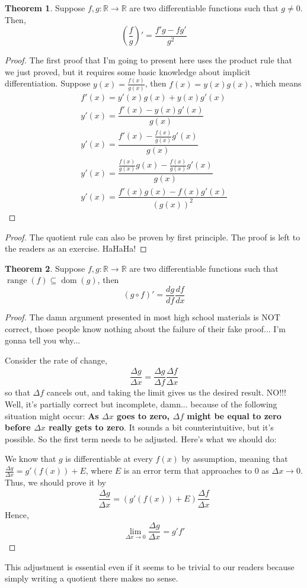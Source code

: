 \documentclass{article}
\theoremstyle{definition}
\theoremstyle{definition}
\theoremstyle{definition}
\theoremstyle{definition}
\theoremstyle{definition}
\theoremstyle{definition}
\theoremstyle{definition}
\theoremstyle{definition}
\theoremstyle{definition}
\newtheorem{theorem}{Theorem}[section]
\begin{document}
\begin{theorem}
Suppose $f,g:\mathbb{R}\to\mathbb{R}$ are two differentiable functions such that $g\neq 0$. Then, 
$$\left(\frac{f}{g}\right)'=\dfrac{f'g-fg'}{g^2}$$
\end{theorem}
\begin{proof}
The first proof that I'm going to present here uses the product rule that we just proved, but it requires some basic knowledge about implicit differentiation.
Suppose $y(x)=\frac{f(x)}{g(x)}$, then $f(x)=y(x)g(x)$, which means \begin{align*}
    f'(x)=y'(x)g(x)+y(x)g'(x)\\
    y'(x)=\dfrac{f'(x)-y(x)g'(x)}{g(x)}\\
    y'(x)=\dfrac{f'(x)-\frac{f(x)}{g(x)}g'(x)}{g(x)}\\
    y'(x)=\dfrac{\frac{f(x)}{g(x)}g(x)-\frac{f(x)}{g(x)}g'(x)}{g(x)}\\
    y'(x)=\dfrac{f'(x)g(x)-f(x)g'(x)}{(g(x))^2}
\end{align*}
\end{proof}
\begin{proof}
The quotient rule can also be proven by first principle. The proof is left to the readers as an exercise. HaHaHa!
\end{proof}

\begin{theorem}
Suppose $f,g:\mathbb{R}\to\mathbb{R}$ are two differentiable functions such that $\operatorname{range}(f)\subseteq\operatorname{dom}(g)$, then
\[(g\circ f)'=\dfrac{dg}{df}\dfrac{df}{dx}\]
\end{theorem}
\begin{proof}
The damn argument presented in most high school materials is NOT correct, those people know nothing about the failure of their fake proof... I'm gonna tell you why...

Consider the rate of change,
\begin{align*}
    \dfrac{\Delta g}{\Delta x}=\dfrac{\Delta g}{\Delta f}\dfrac{\Delta f}{\Delta x}
\end{align*}
so that $\Delta f$ cancels out, and taking the limit gives us the desired result. NO!!! Well, it's partially correct but incomplete, damn... because of the following situation might occur:
\textbf{As $\Delta x$ goes to zero, $\Delta f$ might be equal to zero before $\Delta x$ really gets to zero}. It sounds a bit counterintuitive, but it's possible. So the first term needs to be adjusted. Here's what we should do:

We know that $g$ is differentiable at every $f(x)$ by assumption, meaning that $\frac{\Delta g}{\Delta x}=g'(f(x))+E$, where $E$ is an error term that approaches to $0$ as $\Delta x\to 0$. Thus, we should prove it by
\begin{align*}
    \dfrac{\Delta g}{\Delta x}=(g'(f(x))+E)\dfrac{\Delta f}{\Delta x}
\end{align*}
Hence,
\begin{align*}
    \lim_{\Delta x\to0}\dfrac{\Delta g}{\Delta x}=g'f'
\end{align*}
\end{proof}
This adjustment is essential even if it seems to be trivial to our readers because simply writing a quotient there makes no sense.
\end{document}
